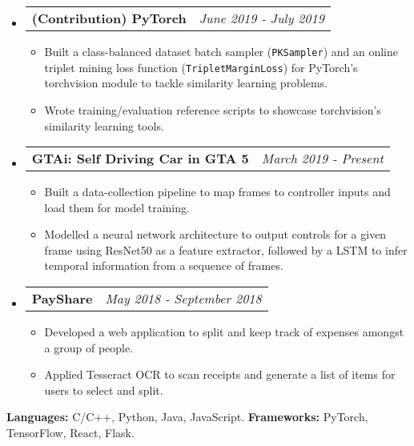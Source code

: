\documentclass[letterpaper, 11pt]{article}
\makeatletter
\newcommand{\resitem}[1]{\item #1 \vspace{-2pt}}
\newcommand{\resheading}[1]{{\large \parashade[.9]{sharpcorners}{\textbf{#1 \vphantom{p\^{E}}}}}}
\newcommand{\ressubheadinga}[2]{
\begin{tabular*}{7.11in}{l@{\extracolsep{\fill}}r}
		\textbf{#1} & #2 \\
\end{tabular*}}
\makeatother
\begin{document}
\begin{itemize}
\item
    \ressubheadinga{(Contribution) PyTorch}{\emph{June 2019 - July 2019}}
    \vspace{-0.25in}
    \begin{itemize}
            \resitem{Built a class-balanced dataset batch sampler (\texttt{PKSampler}) and an online triplet mining loss function (\texttt{TripletMarginLoss}) for PyTorch's torchvision module to tackle similarity learning problems.}
            \resitem{Wrote training/evaluation reference scripts to showcase torchvision's similarity learning tools.}
    \end{itemize}

\item
    \ressubheadinga{GTAi: Self Driving Car in GTA 5}{\emph{March 2019 - Present}}
    \vspace{-0.25in}
    \begin{itemize}
            \resitem{Built a data-collection pipeline to map frames to controller inputs and load them for model training.}
            \resitem{Modelled a neural network architecture to output controls for a given frame using ResNet50 as a feature extractor, followed by a LSTM to infer temporal information from a sequence of frames.}
    \end{itemize}

\item
    \ressubheadinga{PayShare}{\emph{May 2018 - September 2018}}
    \vspace{-0.25in}
    \begin{itemize}
        \resitem{Developed a web application to split and keep track of expenses amongst a group of people.}
        \resitem{Applied Tesseract OCR to scan receipts and generate a list of items for users to select and split.}
    \end{itemize}

\end{itemize}

\vspace{-0.16in}
\resheading{Skills}
\vspace{-0.10in}

\textbf{Languages:} C/C++, Python, Java, JavaScript. \textbf{Frameworks:} PyTorch, TensorFlow, React, Flask.
\end{document}
